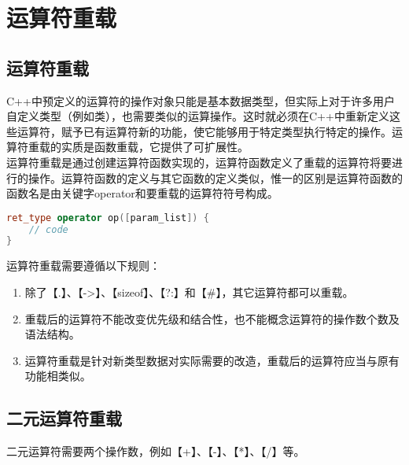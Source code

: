 \newpage

\section{运算符重载}

\subsection{运算符重载}

C++中预定义的运算符的操作对象只能是基本数据类型，但实际上对于许多用户自定义类型（例如类），也需要类似的运算操作。这时就必须在C++中重新定义这些运算符，赋予已有运算符新的功能，使它能够用于特定类型执行特定的操作。运算符重载的实质是函数重载，它提供了可扩展性。\\

运算符重载是通过创建运算符函数实现的，运算符函数定义了重载的运算符将要进行的操作。运算符函数的定义与其它函数的定义类似，惟一的区别是运算符函数的函数名是由关键字operator和要重载的运算符符号构成。

\vspace{-0.5cm}

\begin{lstlisting}[language=C++]
ret_type operator op([param_list]) {
    // code
}
\end{lstlisting}

运算符重载需要遵循以下规则：

\begin{enumerate}
	\item 除了【.】、【->】、【sizeof】、【?:】和【\#】，其它运算符都可以重载。

	\item 重载后的运算符不能改变优先级和结合性，也不能概念运算符的操作数个数及语法结构。

	\item 运算符重载是针对新类型数据对实际需要的改造，重载后的运算符应当与原有功能相类似。
\end{enumerate}

\vspace{0.5cm}

\subsection{二元运算符重载}

二元运算符需要两个操作数，例如【+】、【-】、【*】、【/】等。\\


